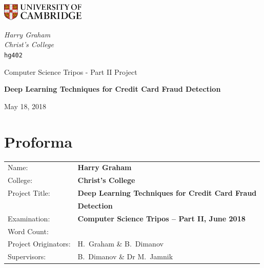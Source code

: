 \documentclass[12pt,a4paper,twoside]{report}
\begin{document}
\begin{titlepage}
	\noindent
	\begin{minipage}[t][][t]{0.5\textwidth}
		\includegraphics[width=40mm]{CamLogo.jpg}
	\end{minipage}
	\begin{minipage}{0.5\textwidth}
	\begin{flushright}
		\large
		\textit{Harry Graham}
		\\
		\textit{Christ's College}
		\\
		\texttt{hg402}
	\end{flushright}
	\end{minipage}
	
	\begin{center}
	\vspace{6cm}
	{\sc\large Computer Science Tripos - Part II Project\par}
	\vspace{0.5cm}
	{\huge\bf Deep Learning Techniques for Credit Card Fraud Detection\par}
	\vspace{0.5cm}
	{\large May 18, 2018 \par}
	\end{center}

\end{titlepage}

\pagestyle{plain}

\section*{\huge Proforma}
\vspace{0.5cm}
{\large
\begin{tabular}{ll}
Name:               & \bf Harry Graham \\
College:            & \bf Christ's College \\
Project Title:      & \bf Deep Learning Techniques for Credit Card Fraud \\
			 & \bf Detection \\
Examination:        & \bf Computer Science Tripos -- Part II, June 2018 \\
Word Count:         &  \\
Project Originators: & H.~Graham \& B.~Dimanov \\
Supervisors:         & B.~Dimanov \& Dr M.~Jamnik
\end{tabular}
}
\end{document}

